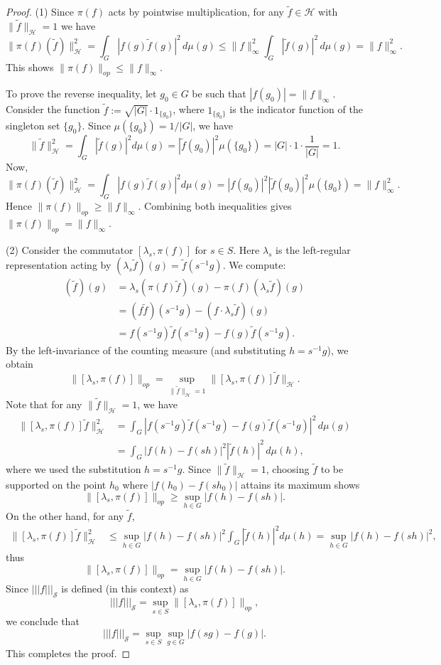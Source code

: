 \documentclass[11pt,reqno]{amsart}
\numberwithin{equation}{section}
\newcommand{\wt}{\widetilde}
\newcommand{\mc}{\mathcal}
\begin{document}
\begin{proof}
(1) Since $\pi(f)$ acts by pointwise multiplication, for any $\wt f \in \mc H$ with $\|\wt f\|_{\mc H}=1$ we have
\[
    \|\pi(f)(\wt f)\|_{\mc H}^2 = \int_G |f(g) \wt f(g)|^2\,d\mu(g) \le \|f\|_{\infty}^2 \int_G |\wt f(g)|^2 \, d\mu(g) = \|f\|_{\infty}^2.
\]
This shows $\|\pi(f)\|_{op} \le \|f\|_{\infty}$.

To prove the reverse inequality, let $g_0 \in G$ be such that $|f(g_0)| = \|f\|_{\infty}$. Consider the function $\wt f := \sqrt{|G|} \cdot 1_{\{g_0\}}$, where $1_{\{g_0\}}$ is the indicator function of the singleton set $\{g_0\}$. Since $\mu(\{g_0\}) = 1/|G|$, we have
\[
    \|\wt f\|_{\mc H}^2 = \int_G |\wt f(g)|^2 d\mu(g) = |\wt f(g_0)|^2 \mu(\{g_0\}) = |G| \cdot 1 \cdot \frac{1}{|G|} = 1.
\]
Now,
\[
    \|\pi(f)(\wt f)\|_{\mc H}^2 = \int_G |f(g)\wt f(g)|^2 d\mu(g) = |f(g_0)|^2 |\wt f(g_0)|^2 \mu(\{g_0\}) = \|f\|_{\infty}^2.
\]
Hence $\|\pi(f)\|_{op} \ge \|f\|_{\infty}$. Combining both inequalities gives $\|\pi(f)\|_{op} = \|f\|_{\infty}$.

(2) Consider the commutator $[\lambda_s, \pi(f)]$ for $s \in S$. Here $\lambda_s$ is the left-regular representation acting by $(\lambda_s \wt f)(g) = \wt f(s^{-1}g)$. We compute:
\begin{align*}
    [\lambda_s, \pi(f)](\wt f)(g) 
    &= \lambda_s(\pi(f)\wt f)(g) - \pi(f)(\lambda_s \wt f)(g) \\
    &= (f\wt f)(s^{-1}g) - (f \cdot \lambda_s \wt f)(g) \\
    &= f(s^{-1}g)\wt f(s^{-1}g) - f(g)\wt f(s^{-1}g).
\end{align*}
By the left-invariance of the counting measure (and substituting $h = s^{-1}g$), we obtain
\[
    \|[\lambda_s,\pi(f)]\|_{op} = \sup_{\|\wt f\|_{\mc H}=1} \|[\lambda_s,\pi(f)]\wt f\|_{\mc H}.
\]
Note that for any $\|\wt f\|_{\mc H}=1$, we have
\begin{align*}
    \|[\lambda_s,\pi(f)]\wt f\|_{\mc H}^2 &= \int_G |f(s^{-1}g)\wt f(s^{-1}g)-f(g)\wt f(s^{-1}g)|^2\, d\mu(g) \\
    &= \int_G |f(h)-f(s h)|^2 |\wt f(h)|^2\, d\mu(h),
\end{align*}
where we used the substitution $h = s^{-1}g$. Since $\|\wt f\|_{\mc H}=1$, choosing $\wt f$ to be supported on the point $h_0$ where $|f(h_0)-f(s h_0)|$ attains its maximum shows
\[
    \|[\lambda_s,\pi(f)]\|_{op} \ge \sup_{h \in G} |f(h)-f(sh)|.
\]
On the other hand, for any $\wt f$,
\begin{align*}
    \|[\lambda_s,\pi(f)]\wt f\|_{\mc H}^2 
    &\le \sup_{h \in G}|f(h)-f(sh)|^2 \int_G |\wt f(h)|^2 d\mu(h)
    = \sup_{h \in G}|f(h)-f(sh)|^2,
\end{align*}
thus
\[
    \|[\lambda_s,\pi(f)]\|_{op} = \sup_{h \in G}|f(h)-f(sh)|.
\]
Since $|||f|||_{\mc S}$ is defined (in this context) as
\[
    |||f|||_{\mc S} = \sup_{s \in S} \|[\lambda_s,\pi(f)]\|_{op},
\]
we conclude that
\[
    |||f|||_{\mc S} = \sup_{s \in S} \sup_{g \in G}|f(sg)-f(g)|.
\]
This completes the proof.
\end{proof}
\end{document}
